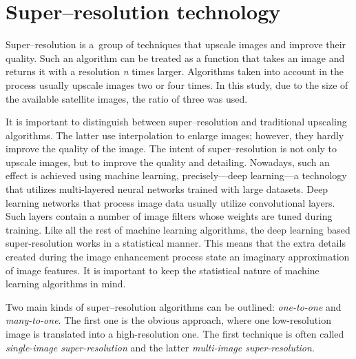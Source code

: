 \section{Super--resolution technology}
Super--resolution is a~group of techniques that upscale images and improve
their quality.
Such an algorithm can be treated as a function that takes an image and returns
it with a resolution \textit{n} times larger.
Algorithms taken into account in the process usually upscale images two or
four times.
In this study, due to the size of the available satellite images, the ratio of three was used.

It is important to distinguish between super--resolution and traditional
upscaling algorithms.
The latter use interpolation to enlarge images; however, they hardly improve the
quality of the image.
The intent of super--resolution is not only to upscale images, but to improve
the quality and detailing.
Nowadays, such an effect is achieved using machine learning, precisely---deep
learning---a technology that utilizes multi-layered neural networks trained
with large datasets.
Deep learning networks that process image data usually utilize convolutional
layers.
Such layers contain a number of image filters whose weights are tuned during training.
Like all the rest of machine learning algorithms, the deep learning based
super-resolution works in a statistical manner.
This means that the extra details created during the image enhancement process
state an imaginary approximation of image features.
It is important to keep the statistical nature of machine learning algorithms
in mind.

Two main kinds of super--resolution algorithms can be outlined:
\textit{one-to-one} and \textit{many-to-one}.
The first one is the obvious approach, where one low-resolution image is
translated into a high-resolution one.
The first technique is often called \textit{single-image super-resolution} and the latter \textit{multi-image super-resolution}.

